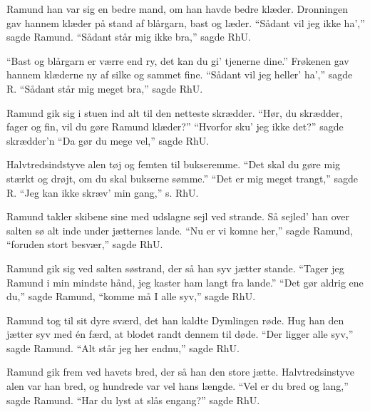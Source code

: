 \medskip

\begin{paracol}{2}
\small

\begin{guitar}
  Ramund han var sig en bedre mand,
  om han havde bedre klæder.
  Dronningen gav hannem klæder på stand
  af blårgarn, bast og læder.
  ``Sådant vil jeg ikke ha','' sagde Ramund.
  ``Sådant står mig ikke bra,'' sagde RhU.

  ``Bast og blårgarn er værre end ry,
  det kan du gi' tjenerne dine.''
  Frøkenen gav hannem klæderne ny
  af silke og sammet fine.
  ``Sådant vil jeg heller' ha','' sagde R.
  ``Sådant står mig meget bra,'' sagde RhU.

  Ramund gik sig i stuen ind
  alt til den netteste skrædder.
  ``Hør, du skrædder, fager og fin,
  vil du gøre Ramund klæder?''
  ``Hvorfor sku' jeg ikke det?'' sagde skrædder'n
  ``Da gør du mege vel,'' sagde RhU.

  Halvtredsindstyve alen tøj
  og femten til bukseremme.
  ``Det skal du gøre mig stærkt og drøjt,
  om du skal bukserne sømme.''
  ``Det er mig meget trangt,'' sagde R.
  ``Jeg kan ikke skræv' min gang,'' s. RhU.

  Ramund takler skibene sine
  med udslagne sejl ved strande.
  Så sejled' han over salten sø
  alt inde under jætternes lande.
  ``Nu er vi komne her,'' sagde Ramund,
  ``foruden stort besvær,'' sagde RhU.

  Ramund gik sig ved salten søstrand,
  der så han syv jætter stande.
  ``Tager jeg Ramund i min mindste hånd,
  jeg kaster ham langt fra lande.''
  ``Det gør aldrig ene du,'' sagde Ramund,
  ``komme må I alle syv,'' sagde RhU.
\end{guitar}

\switchcolumn

\begin{guitar}
  Ramund tog til sit dyre sværd,
  det han kaldte Dymlingen røde.
  Hug han den jætter syv med én færd,
  at blodet randt dennem til døde.
  ``Der ligger alle syv,'' sagde Ramund.
  ``Alt står jeg her endnu,'' sagde RhU.

  Ramund gik frem ved havets bred,
  der så han den store jætte.
  Halvtredsinstyve alen var han bred,
  og hundrede var vel hans længde.
  ``Vel er du bred og lang,'' sagde Ramund.
  ``Har du lyst at slås engang?'' sagde RhU.


\end{guitar}
\end{paracol}
